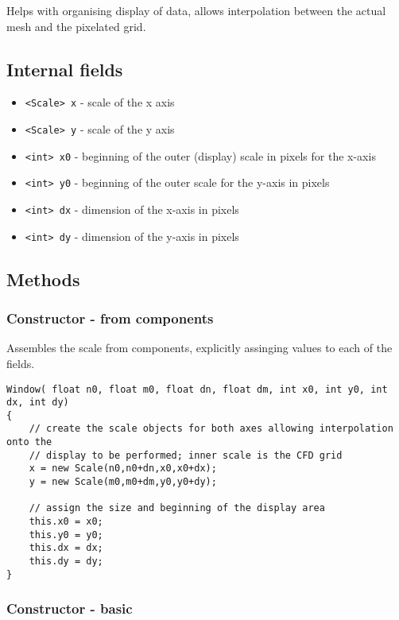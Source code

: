 \documentclass[notitlepage]{article}
\begin{document}
Helps with organising display of data, allows interpolation between the actual mesh
and the pixelated grid.

\subsection{Internal fields}

\begin{itemize}
\item \texttt{<Scale> x} - scale of the x axis
\item \texttt{<Scale> y} - scale of the y axis
\item \texttt{<int> x0} - beginning of the outer (display) scale in pixels for the x-axis
\item \texttt{<int> y0} - beginning of the outer scale for the y-axis in pixels
\item \texttt{<int> dx} - dimension of the x-axis in pixels
\item \texttt{<int> dy} - dimension of the y-axis in pixels
\end{itemize}

\subsection{Methods}

\subsubsection{Constructor - from components}

Assembles the scale from components, explicitly assinging values to each of the fields.

\begin{lstlisting}[style=myCpp]
Window( float n0, float m0, float dn, float dm, int x0, int y0, int dx, int dy)
{
	// create the scale objects for both axes allowing interpolation onto the
	// display to be performed; inner scale is the CFD grid
	x = new Scale(n0,n0+dn,x0,x0+dx);
	y = new Scale(m0,m0+dm,y0,y0+dy);
	
	// assign the size and beginning of the display area
	this.x0 = x0;
	this.y0 = y0;
	this.dx = dx;
	this.dy = dy;
}
\end{lstlisting}

\subsubsection{Constructor - basic}
\end{document}
